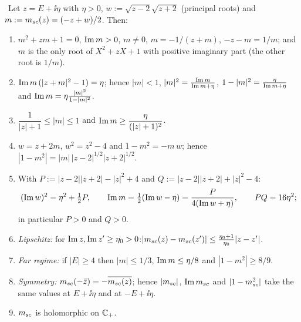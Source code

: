 \begin{lemma}\label{lem:msc} \infra\
Let $z=E+\ii\eta$ with $\eta>0$, $w:=\sqrt{z-2}\sqrt{z+2}$ (principal roots) and $m:=m_{sc}(z)=(-z+w)/2$. Then:
\begin{enumerate}[label=\textup{(\alph*)},leftmargin=2.2em,itemsep=1pt]
\item $m^2+zm+1=0$, $\operatorname{Im} m>0$, $m\ne0$, $m=-1/(z+m)$, $-z-m=1/m$; and $m$ is the only root of $X^2+zX+1$ with positive imaginary part (the other root is $1/m$).
\item $\operatorname{Im} m\,(|z+m|^2-1)=\eta$; hence $|m|<1$, $|m|^2=\frac{\operatorname{Im} m}{\operatorname{Im} m+\eta}$, $1-|m|^2=\frac{\eta}{\operatorname{Im} m+\eta}$ and $\operatorname{Im} m=\eta\frac{|m|^2}{1-|m|^2}$.
\item $\dfrac1{|z|+1}\le|m|\le1$ and $\operatorname{Im} m\ge\dfrac{\eta}{(|z|+1)^2}$.
\item $w=z+2m$, $w^2=z^2-4$ and $1-m^2=-m\,w$; hence $|1-m^2|=|m|\,|z-2|^{1/2}|z+2|^{1/2}$.
\item With $P:=|z-2||z+2|-|z|^2+4$ and $Q:=|z-2||z+2|+|z|^2-4$:
\[
 (\operatorname{Im} w)^2=\eta^2+\tfrac12P,\qquad \operatorname{Im} m=\tfrac12(\operatorname{Im} w-\eta)=\dfrac{P}{4(\operatorname{Im} w+\eta)},\qquad PQ=16\eta^2 ;
\]
in particular $P>0$ and $Q>0$.
\item \emph{Lipschitz:} for $\operatorname{Im} z,\operatorname{Im} z'\ge\eta_0>0$:\quad $|m_{sc}(z)-m_{sc}(z')|\le\frac{\eta_0+1}{\eta_0}|z-z'|$.
\item \emph{Far regime:} if $|E|\ge4$ then $|m|\le1/3$, $\operatorname{Im} m\le\eta/8$ and $|1-m^2|\ge8/9$.
\item \emph{Symmetry:} $m_{sc}(-\bar z)=-\overline{m_{sc}(z)}$; hence $|m_{sc}|$, $\operatorname{Im}m_{sc}$ and $|1-m_{sc}^2|$ take the same values at $E+\ii\eta$ and at $-E+\ii\eta$.
\item $m_{sc}$ is holomorphic on $\mathbb{C}_+$.
\end{enumerate}
\end{lemma}
